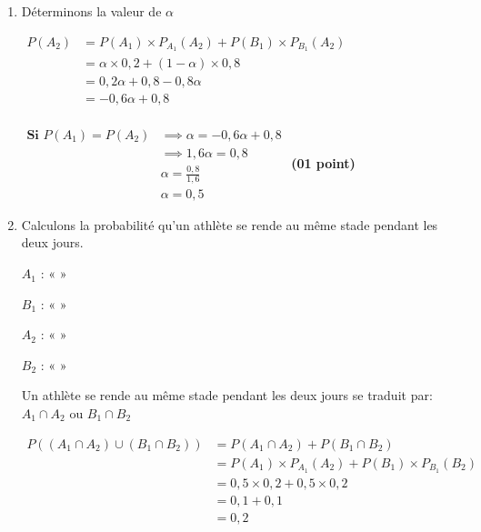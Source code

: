 \documentclass[12pt,a4paper]{article}
\begin{document}
\begin{enumerate}
    \item Déterminons la valeur de $\alpha$

          $
              \begin{aligned}
                  P(A_2) & = P(A_1) \times P_{A_1}(A_2) + P(B_1) \times P_{B_1}(A_2) \\
                         & = \alpha \times 0,2 + (1-\alpha) \times 0,8               \\
                         & = 0,2\alpha + 0,8-0,8\alpha                               \\
                         & = -0,6\alpha + 0,8                                        \\
              \end{aligned}
          $

          $
              \begin{aligned}
                  \textbf{Si } P(A_1)=P(A_2) & \implies \alpha = -0,6\alpha + 0,8 \\
                                             & \implies 1,6\alpha = 0,8           \\
                                             & \alpha = \frac{0,8}{1,6}           \\
                                             & \alpha = 0,5
              \end{aligned}
          $
          \hfill \textbf{(01 point)}
    \item Calculons la probabilité qu’un athlète se rende au même stade pendant les deux jours.

          $A_1$ :  « »

          $B_1$ :  « »

          $A_2$ :  « »

          $B_2$ :  « »

          Un athlète se rende au même stade pendant les deux jours se traduit par: $A_1\cap A_2$ ou $B_1\cap B_2$

          $
              \begin{aligned}
                  P((A_1\cap A_2) \cup (B_1\cap B_2)) & = P(A_1\cap A_2) + P(B_1\cap B_2)                        \\
                                                      & =P(A_1) \times P_{A_1}(A_2) + P(B_1) \times P_{B_1}(B_2) \\
                                                      & =0,5 \times 0,2 + 0,5 \times 0,2                         \\
                                                      & =0,1 + 0,1                                               \\
                                                      & =0,2                                                     \\
              \end{aligned}
          $



\end{enumerate}
\end{document}
